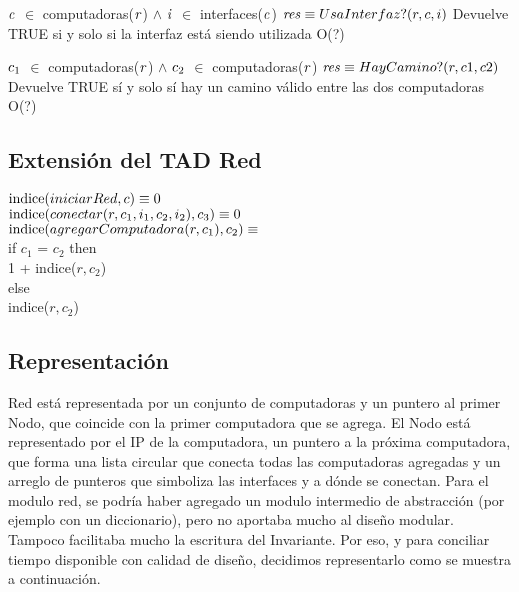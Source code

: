  {$\text{\textit{c}}$ $\in$ computadoras($\text{\textit{r}}$) $\land$ $\text{\textit{i}}$ $\in$ interfaces($\text{\textit{c}}$)}
 {$\text{\textit{res}} \equiv UsaInterfaz?(r,c,i)$}
 {Devuelve TRUE si y solo si la interfaz está siendo utilizada}
 {O(?)}

 {$\text{\textit{$c_{1}$}}$ $\in$ computadoras($\text{\textit{r}}$) $\land$ $\text{\textit{$c_{2}$}}$ $\in$ computadoras($\text{\textit{r}}$)}
 {$\text{\textit{res}} \equiv HayCamino?(r,c1,c2)$}
 {Devuelve TRUE sí y solo sí hay un camino válido entre las dos computadoras}
 {O(?)}

\subsection{Extensión del TAD Red}
$\text{\normalfont indice}(iniciarRed, c) \equiv 0$ \\
$\text{\normalfont indice}(conectar(r,c_{1},i_{1},c_{2},i_{2}), c_{3}) \equiv 0$ \\
$\text{\normalfont indice}(agregarComputadora(r,c_{1}), c_{2}) \equiv$ 
	\\ if $c_{1}$ = $c_{2}$ then \\ 1 + indice($r,c_{2}$) \\ else \\ indice($r,c_{2}$)


\subsection{Representación}
Red está representada por un conjunto de computadoras y un puntero al primer Nodo, que coincide con la primer computadora que se agrega. El Nodo está representado por el IP de la computadora, un puntero a la próxima computadora, que forma una lista circular que conecta todas las computadoras agregadas y un arreglo de punteros que simboliza las interfaces y a dónde se conectan.
Para el modulo red, se podría haber agregado un modulo intermedio de abstracción (por ejemplo con un diccionario), pero no aportaba mucho al diseño modular. Tampoco facilitaba mucho la escritura del Invariante. Por eso, y para conciliar tiempo disponible con calidad de diseño, decidimos representarlo como se muestra a continuación.



